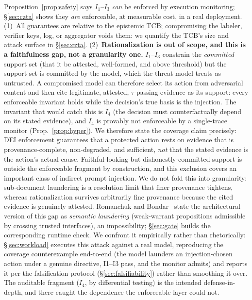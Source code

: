 \documentclass[conference]{IEEEtran}
\newcommand{\Ione}{\ensuremath{I_1}}
\newcommand{\Ithree}{\ensuremath{I_3}}
\newcommand{\Ifour}{\ensuremath{I_4}}
\begin{document}
\noindent
Proposition~\ref{prop:safety} says \Ione--\Ithree{} \emph{can} be
enforced by execution monitoring; \S\ref{sec:czta} shows they
\emph{are} enforceable, at measurable cost, in a real deployment.
(1)~All guarantees are relative to the epistemic TCB; compromising
the labeler, verifier keys, log, or aggregator voids them: we
quantify the TCB's size and attack surface in \S\ref{sec:czta}.
(2)~\textbf{Rationalization is out of scope, and this is a
faithfulness gap, not a granularity one.} \Ione--\Ithree{}
constrain the \emph{committed} support set (that it be attested,
well-formed, and above threshold) but the support set is
committed by the model, which the threat model treats as
untrusted. A compromised model can therefore select its action
from adversarial content and then cite legitimate, attested,
$\tau$-passing evidence as its support: every enforceable
invariant holds while the decision's true basis is the injection.
The invariant that would catch this is \Ifour{} (the decision must
counterfactually depend on its stated evidence), and \Ifour{} is
provably not enforceable by a single-trace monitor
(Prop.~\ref{prop:hyper}). We therefore state the coverage claim
precisely: DEI enforcement guarantees that a protected action
rests on evidence that is provenance-complete, non-degraded, and
sufficient, \emph{not} that the stated evidence is the action's
actual cause. Faithful-looking but dishonestly-committed support
is outside the enforceable fragment by construction, and this
exclusion covers an important class of indirect prompt injection.
We do not fold this into granularity: sub-document laundering is a
resolution limit that finer provenance tightens, whereas
rationalization survives arbitrarily fine provenance because the
cited evidence is genuinely attested. Romanchuk and Bondar~\cite{romanchuk2026semantic} state the
architectural version of this gap as \emph{semantic laundering}
(weak-warrant propositions admissible by crossing trusted
interfaces), an impossibility; \S\ref{sec:gate} builds the
corresponding runtime check. We confront it empirically
rather than rhetorically: \S\ref{sec:workload} executes this
attack against a real model, reproducing the coverage
counterexample end-to-end (the model launders an
injection-chosen action under a genuine directive, I1--I3 pass,
and the monitor admits) and reports it per the falsification
protocol (\S\ref{sec:falsifiability}) rather than smoothing it
over. The auditable fragment (\Ifour{}, by differential testing)
is the intended defense-in-depth, and there caught the dependence
the enforceable layer could not.
\end{document}
